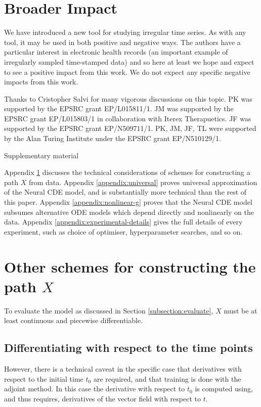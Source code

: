 \documentclass{article}
\theoremstyle{plain}
\theoremstyle{definition}
\begin{document}
	\section*{Broader Impact}
	We have introduced a new tool for studying irregular time series. As with any tool, it may be used in both positive and negative ways. The authors have a particular interest in electronic health records (an important example of irregularly sampled time-stamped data) and so here at least we hope and expect to see a positive impact from this work. We do not expect any specific negative impacts from this work.

	\begin{ack}
	Thanks to Cristopher Salvi for many vigorous discussions on this topic. PK was supported by the EPSRC grant EP/L015811/1. JM was supported by the EPSRC grant EP/L015803/1 in collaboration with Iterex Therapuetics. JF was supported by the EPSRC grant EP/N509711/1. PK, JM, JF, TL were supported by the Alan Turing Institute under the EPSRC grant EP/N510129/1.
	\end{ack}
	
	\small
	
	 
	
	\normalsize
	\newpage
	\appendix
	
	\begin{center}
	\huge Supplementary material
	\end{center}
	Appendix \ref{appendix:other-schemes-for-x} discusses the technical considerations of schemes for constructing a path $X$ from data. Appendix \ref{appendix:universal} proves universal approximation of the Neural CDE model, and is substantially more technical than the rest of this paper. Appendix \ref{appendix:nonlinear-g} proves that the Neural CDE model subsumes alternative ODE models which depend directly and nonlinearly on the data. Appendix \ref{appendix:experimental-details} gives the full details of every experiment, such as choice of optimiser, hyperparameter searches, and so on.
	
	\section{Other schemes for constructing the path $X$}\label{appendix:other-schemes-for-x}
	To evaluate the model as discussed in Section \ref{subsection:evaluate}, $X$ must be at least continuous and piecewise differentiable.
	
	\subsection{Differentiating with respect to the time points}
	However, there is a technical caveat in the specific case that derivatives with respect to the initial time $t_0$ are required, and that training is done with the adjoint method. In this case the derivative with respect to $t_0$ is computed using, and thus requires, derivatives of the vector field with respect to $t$.
	
\end{document}
